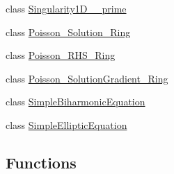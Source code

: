 \begin{CompactItemize}
\item 
class \hyperlink{classFrameTL_1_1Singularity1D__2__prime}{Singularity1D\_\_\-prime}
\item 
class \hyperlink{classFrameTL_1_1Poisson__Solution__Ring}{Poisson\_\-Solution\_\-Ring}
\item 
class \hyperlink{classFrameTL_1_1Poisson__RHS__Ring}{Poisson\_\-RHS\_\-Ring}
\item 
class \hyperlink{classFrameTL_1_1Poisson__SolutionGradient__Ring}{Poisson\_\-SolutionGradient\_\-Ring}
\item 
class \hyperlink{classFrameTL_1_1SimpleBiharmonicEquation}{SimpleBiharmonicEquation}
\item 
class \hyperlink{classFrameTL_1_1SimpleEllipticEquation}{SimpleEllipticEquation}
\end{CompactItemize}
\subsection*{Functions}
